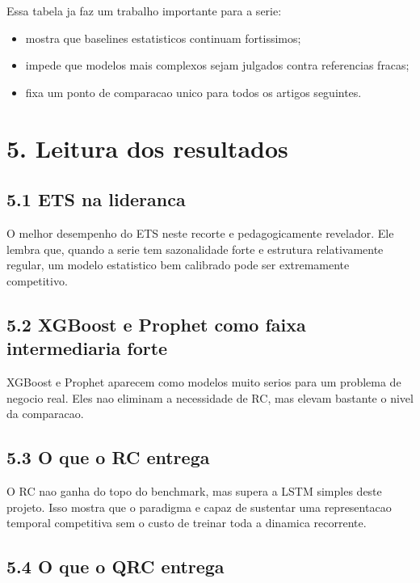 \documentclass[12pt]{article}
\providecommand{\tightlist}{%
  \setlength{\itemsep}{0pt}\setlength{\parskip}{0pt}}
\begin{document}
Essa tabela ja faz um trabalho importante para a serie:

\begin{itemize}
\tightlist
\item
  mostra que baselines estatisticos continuam fortissimos;
\item
  impede que modelos mais complexos sejam julgados contra referencias fracas;
\item
  fixa um ponto de comparacao unico para todos os artigos seguintes.
\end{itemize}

\section{5. Leitura dos resultados}\label{5-leitura-dos-resultados}

\subsection{5.1 ETS na lideranca}\label{51-ets-na-lideranca}

O melhor desempenho do ETS neste recorte e pedagogicamente revelador. Ele lembra que, quando a serie tem sazonalidade forte e estrutura relativamente regular, um modelo estatistico bem calibrado pode ser extremamente competitivo.

\subsection{5.2 XGBoost e Prophet como faixa intermediaria forte}\label{52-xgboost-e-prophet-como-faixa-intermediaria-forte}

XGBoost e Prophet aparecem como modelos muito serios para um problema de negocio real. Eles nao eliminam a necessidade de RC, mas elevam bastante o nivel da comparacao.

\subsection{5.3 O que o RC entrega}\label{53-o-que-o-rc-entrega}

O RC nao ganha do topo do benchmark, mas supera a LSTM simples deste projeto. Isso mostra que o paradigma e capaz de sustentar uma representacao temporal competitiva sem o custo de treinar toda a dinamica recorrente.

\subsection{5.4 O que o QRC entrega}\label{54-o-que-o-qrc-entrega}
\end{document}
